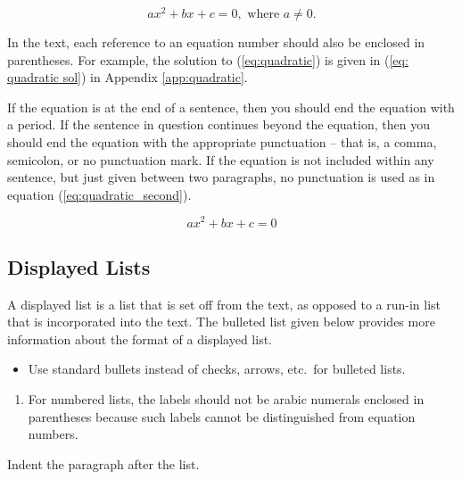 \documentclass{wscpaperproc}
\theoremstyle{wsc}
\begin{document}
\begin{equation} \label{eq:quadratic}
ax^2 + bx + c = 0, \mbox{ where } a \ne 0.
\end{equation}

In the text, each reference to an equation number should also be enclosed in parentheses. For example, the solution to (\ref{eq:quadratic}) is given in (\ref{eq: quadratic sol}) in Appendix \ref{app:quadratic}.

If the equation is at the end of a sentence, then you should end the equation with a period. If the sentence in question continues beyond the equation, then you should end the equation with the appropriate punctuation -- that is, a comma, semicolon, or no punctuation mark. If the equation is not included within any sentence, but just given between two paragraphs, no punctuation is used as in equation (\ref{eq:quadratic_second}).

\begin{equation} \label{eq:quadratic_second}
ax^2 + bx + c = 0
\end{equation}

\subsection{Displayed Lists}
A displayed list is a list that is set off from the text, as opposed to a run-in list that is incorporated into the text. The bulleted list given below provides more information about the format of a displayed list.

\begin{itemize}
	\item Use standard bullets instead of checks, arrows, etc.\ for bulleted lists.
\end{itemize}
\begin{enumerate}
	\item For numbered lists, the labels should not be arabic numerals enclosed in parentheses because such labels cannot be distinguished from equation numbers.
\end{enumerate}

Indent the paragraph after the list.
\end{document}
